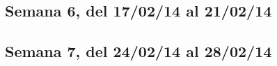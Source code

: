 \documentclass[11pt,oneside,titlepage]{article}
\begin{document}
\subsection*{Semana 6, del 17/02/14 al 21/02/14}
\begin{comment}
lunes 
- Se adquirio el cable, se connecto pero no funciono. Se revisa si los
módulos estan compilados.  
-  Estudiar la posibilidad de crear un driver.  
- Se manda correo a lista-usb. Espera de respuesta.

martes -  No es posible conectar el cable usb entre PC. El hardware USB que
traen los PCI no es soportado por el driver linux gadget que es el encargado de
realizar esta conexión, 
- Hemos descartado la posibilidad de conectar PC to PC
con un cable simple.  Decidimos realizar la conexión a través de ethernet.

miercoles 
- NAAAAAAAAAAAAADAAAAAAAAAAAAAAA 

jueves 
- NNNNNNNNNNNNAAAAAAAAAAAADAAAAAAAaaaa 
viernes 
- NAAAAAAAAAAAAAAAADAAAAAAAAAAAa

\end{comment}

\subsection*{Semana 7, del 24/02/14 al 28/02/14}
\begin{comment}

lunes
- Se decide por comprar la tarjeta desarrollo USB33880 , Claudio Torres no
escucha nuestras advertencias de que hay que realiar el driver completamente y
aún asi decide comprarla. Francisco nos pide que le mandemos el valor para que
la Universidad realice la compra, el producto no es disponible. Mantemos al
tanto a Torres sobre el problema, no sabemos que hacer.  Por mientras cada uno
hace lo suyo.
-  

lunes
\end{comment}
\end{document}
